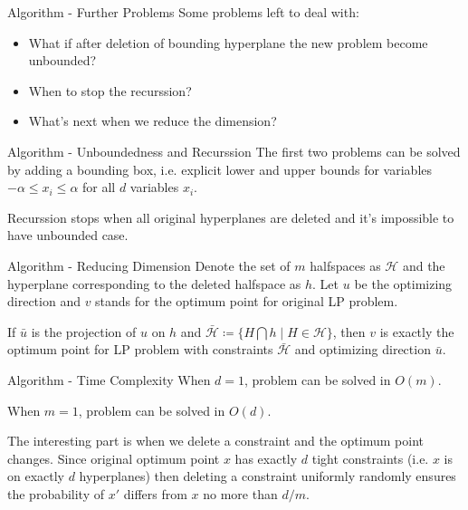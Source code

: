 \documentclass{beamer}
\begin{document}
\begin{frame}{Algorithm - Further Problems}
	Some problems left to deal with:

	\begin{itemize}
		\item What if after deletion of bounding hyperplane the new problem become unbounded?
		\item When to stop the recurssion?
		\item What's next when we reduce the dimension?
	\end{itemize}
\end{frame}
\begin{frame}{Algorithm - Unboundedness and Recurssion}
	The first two problems can be solved by adding a bounding box, i.e. explicit lower and upper bounds for
	variables $-\alpha \le x_i \le \alpha$ for all $d$ variables $x_i$.

	\vspace{\baselineskip}

	Recurssion stops when all original hyperplanes are deleted and it's impossible to have unbounded case.

\end{frame}
\begin{frame}{Algorithm - Reducing Dimension}
	Denote the set of $m$ halfspaces as $\mathcal{H}$ and the hyperplane corresponding to the deleted halfspace as $h$.
	Let $u$ be the optimizing direction and $v$ stands for the optimum point for original LP problem.

	\vspace{\baselineskip}

	If $\bar{u}$ is the projection of $u$ on $h$ and $\bar{\mathcal{H}} \coloneq \{H \bigcap h \mid H \in \mathcal{H}\}$, then $v$ is exactly
	the optimum point for LP problem with constraints $\bar{\mathcal{H}}$ and optimizing direction $\bar{u}$.
\end{frame}
\begin{frame}{Algorithm - Time Complexity}
	When $d = 1$, problem can be solved in $O(m)$.

	\vspace{\baselineskip}

	When $m = 1$, problem can be solved in $O(d)$.

	\vspace{\baselineskip}

	The interesting part is when we delete a constraint and the optimum point changes.
	Since original optimum point $x$ has exactly $d$ tight constraints (i.e.
	$x$ is on exactly $d$ hyperplanes) then deleting a constraint uniformly randomly ensures
	the probability of $x'$ differs from $x$ no more than $d / m$.
\end{frame}
\end{document}
